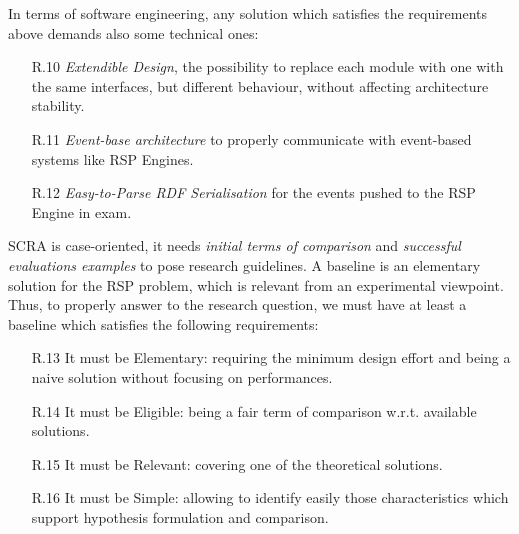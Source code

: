 In terms of software engineering, any solution which satisfies the requirements above demands also some technical ones: 
\begin{enumerate}
\item[R.10] \textit{Extendible Design}, the possibility to replace each module with one with the same interfaces, but different behaviour, without affecting architecture stability.
\item[R.11] \textit{Event-base architecture} to properly communicate with event-based systems like RSP Engines.
\item[R.12] \textit{Easy-to-Parse RDF Serialisation} for the events pushed to the RSP Engine in exam.
\end{enumerate}

\noindent SCRA is case-oriented, it needs  \textit{initial terms of comparison} and \textit{successful evaluations examples} to pose research guidelines. A baseline is an elementary solution for the RSP problem, which is relevant from an experimental viewpoint. 	Thus, to properly answer to the research question, we must have at least a baseline which satisfies the following requirements: 
\begin{enumerate}
\item[R.13] It must be Elementary: requiring the minimum design effort and being a naive solution without focusing on performances.  %
\item[R.14] It must be Eligible: being a fair term of comparison w.r.t. available solutions. %
\item[R.15] It must be Relevant: covering one of the theoretical solutions. %
\item[R.16] It must be Simple: allowing to identify easily those characteristics which support hypothesis formulation and comparison.  %
\end{enumerate}


